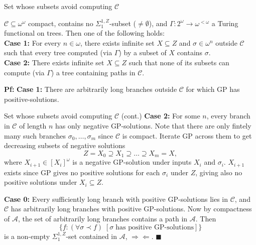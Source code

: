 \begin{frame}{Set whose subsets avoid computing $\mathcal{C}$}
  \begin{lemma}
    $\mathcal{C}\subseteq\omega^\omega$ compact, contains no
    $\Sigma_1^{1,Z}$-subset ($\neq\emptyset$), and
    $\Gamma:2^{\omega}\rightarrow \omega^{<\omega}$ a Turing functional on
    trees. Then one of the following holds:\\
    \vspace{0.5em}
    \textbf{Case 1:} For every $n\in\omega$, there exists infinite set
    $X\subseteq Z$ and $\sigma\in\omega^n$ outside $\mathcal{C}$ such that
    every tree computed (via $\Gamma$) by a subset of $X$ contains
    $\sigma$.\\
    \vspace{0.5em}
    \textbf{Case 2:} There exists infinite set $X\subseteq Z$ such that
    none of its subsets can compute (via $\Gamma$) a tree containing paths
    in $\mathcal{C}$.
  \end{lemma}

  \vspace{1em}
  \textbf{Pf:} \textbf{Case 1:} There are arbitrarily long branches outside
  $\mathcal{C}$ for which GP has positive-solutions.
\end{frame}

\begin{frame}{Set whose subsets avoid computing $\mathcal{C}$ (cont.)}
  \textbf{Case 2:} For some $n$, every branch in $\mathcal{C}$ of length
  $n$ has only negative GP-solutions. Note that there are only fintely many
  such branches $\sigma_0,\ldots,\sigma_m$ since $\mathcal{C}$ is compact.
  Iterate GP across them to get decreasing subsets of negative solutions
  \[Z=X_0 \supseteq X_1 \supseteq \ldots\supseteq X_m=X,\]
  where $X_{i+1}\in[X_i]^\omega$ is a negative GP-solution under inputs
  $X_i$ and $\sigma_i$. $X_{i+1}$ exists since GP gives no positive
  solutions for each $\sigma_i$ under $Z$, giving also no positive
  solutions under $X_i\subseteq Z$.

  \vspace{0.5em}
  \textbf{Case 0:} Every sufficiently long branch with positive
  GP-solutions lies in $\mathcal{C}$, and $\mathcal{C}$ has arbitrarily
  long branches with positive GP-solutions. Now by compactness of
  $\mathcal{A}$, the set of arbitrarily long branches contains a path
  in $\mathcal{A}$. Then \[\{f:(\forall \sigma\prec f)\; [\sigma\; \text{has
  positive GP-solutions}]\}\] is a non-empty $\Sigma_1^{1,Z}$-set contained
  in $\mathcal{A}$, $\Rightarrow\Leftarrow$. $\blacksquare$
\end{frame}

